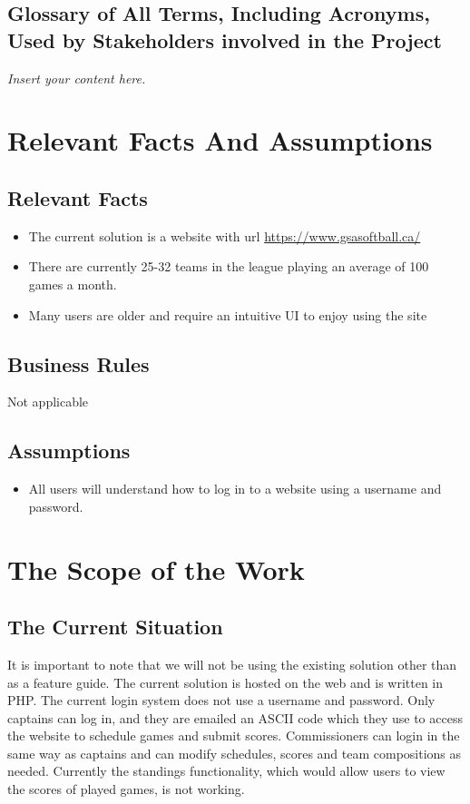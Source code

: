 \documentclass[12pt]{article}
\newcommand{\lips}{\textit{Insert your content here.}}
\begin{document}
\subsection{Glossary of All Terms, Including Acronyms, Used by Stakeholders
involved in the Project}
\lips

\section{Relevant Facts And Assumptions}
\subsection{Relevant Facts}
\begin{itemize}
  \item The current solution is a website with url 
  \url{https://www.gsasoftball.ca/}
  \item There are currently 25-32 teams in the league playing an average of
  100 games a month.
  \item Many users are older and require an intuitive UI to enjoy using the
  site
\end{itemize}

\subsection{Business Rules}
Not applicable

\subsection{Assumptions}
\begin{itemize}
  \item All users will understand how to log in to a website using a username
  and password.
\end{itemize}

\section{The Scope of the Work}
\subsection{The Current Situation}
It is important to note that we will not be using the existing solution other
than as a feature guide. The current solution is hosted on the web and is
written in PHP. The current login system does not use a username and password.
Only captains can log in, and they are emailed an ASCII code which they use to
access the website to schedule games and submit scores. Commissioners can login
in the same way as captains and can modify schedules, scores and team
compositions as needed. Currently the standings functionality, which would
allow users to view the scores of played games, is not working.
\end{document}
